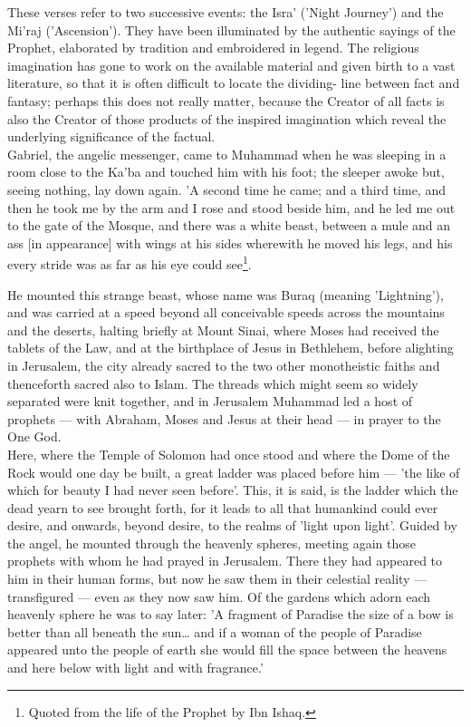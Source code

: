 \documentclass[11pt, b5paper, twoside]{book}
\begin{document}
These verses refer to two successive events: the Isra' ('Night Journey') and the Mi'raj 
('Ascension'). They have been illuminated by the authentic sayings of the Prophet, elaborated by 
tradition and embroidered in legend. The religious imagination has gone to work on the available 
material and given birth to a vast literature, so that it is often difficult to locate the dividing-
line between fact and fantasy; perhaps this does not really matter, because the Creator of all facts 
is also the Creator of those products of the inspired imagination which reveal the underlying 
significance of the factual. \\

Gabriel, the angelic messenger, came to Muhammad when he was sleeping in a room close to the Ka'ba 
and touched him with his foot; the sleeper awoke but, seeing nothing, lay down again. 'A second time 
he came; and a third time, and then he took me by the arm and I rose and stood beside him, and he led 
me out to the gate of the Mosque, and there was a white beast, between a mule and an ass [in 
appearance] with wings at his sides wherewith he moved his legs, and his every stride was as far as 
his eye could see\footnote{Quoted from the life of the Prophet by Ibn Ishaq.}.

He mounted this strange beast, whose name was Buraq (meaning 'Lightning'), and was carried at a speed 
beyond all conceivable speeds across the mountains and the deserts, halting briefly at Mount Sinai, 
where Moses had received the tablets of the Law, and at the birthplace of Jesus in Bethlehem, before 
alighting in Jerusalem, the city already sacred to the two other monotheistic faiths and thenceforth 
sacred also to Islam. The threads which might seem so widely separated were knit together, and in 
Jerusalem Muhammad led a host of prophets --- with Abraham, Moses and Jesus at their head --- in prayer to the One God. \\

Here, where the Temple of Solomon had once stood and where the Dome of the Rock would one day be 
built, a great ladder was placed before him --- 'the like of which for beauty I had never seen before'. 
This, it is said, is the ladder which the dead yearn to see brought forth, for it leads to all that 
humankind could ever desire, and onwards, beyond desire, to the realms of 'light upon light'. Guided 
by the angel, he mounted through the heavenly spheres, meeting again those prophets with whom he had 
prayed in Jerusalem. There they had appeared to him in their human forms, but now he saw them in 
their celestial reality --- transfigured --- even as they now saw him. Of the gardens which adorn each 
heavenly sphere he was to say later: 'A fragment of Paradise the size of a bow is better than all 
beneath the sun\ldots{} and if a woman of the people of Paradise appeared unto the people of earth she 
would fill the space between the heavens and here below with light and with fragrance.' \\
\end{document}
